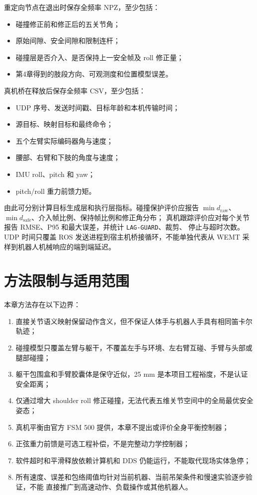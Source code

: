 重定向节点在退出时保存全频率 NPZ，至少包括：
\begin{itemize}
  \item 碰撞修正前和修正后的五关节角；
  \item 原始间隙、安全间隙和限制连杆；
  \item 碰撞层是否介入、是否保持上一安全帧及 roll 修正量；
  \item 第4章得到的肢段方向、可观测度和位置模型误差。
\end{itemize}

真机桥在释放后保存全频率 CSV，至少包括：
\begin{itemize}
  \item UDP 序号、发送时间戳、目标年龄和本机传输时间；
  \item 源目标、映射目标和最终命令；
  \item 五个左臂实际编码器角与速度；
  \item 腰部、右臂和下肢的角度与速度；
  \item IMU roll、pitch 和 yaw；
  \item pitch/roll 重力前馈力矩。
\end{itemize}

由此可分别计算目标生成层和执行层指标。碰撞保护评价应报告
$\min d_{\mathrm{raw}}$、$\min d_{\mathrm{safe}}$、介入帧比例、保持帧比例和修正角分布；
真机跟踪评价应对每个关节报告 RMSE、P95 和最大误差，并统计 \texttt{LAG-GUARD}、裁剪、
停止与超时次数。UDP 时间只覆盖 ROS 发送进程到宿主机桥接循环，不能单独代表从 WEMT
采样到机器人机械响应的端到端延迟。

\section{方法限制与适用范围}
\label{sec:ch5_limitations}

本章方法存在以下边界：
\begin{enumerate}[label=\arabic*)]
  \item 直接关节语义映射保留动作含义，但不保证人体手与机器人手具有相同笛卡尔轨迹；
  \item 碰撞模型只覆盖左臂与躯干，不覆盖左手与环境、左右臂互碰、手臂与头部或腿部碰撞；
  \item 躯干包围盒和手臂胶囊体是保守近似，25 mm 是本项目工程裕度，不是认证安全距离；
  \item 仅通过增大 shoulder roll 修正碰撞，无法代表五维关节空间中的全局最优安全姿态；
  \item 真机平衡由官方 FSM 500 提供，本章不提出或评价全身平衡控制器；
  \item 正弦重力前馈是可选工程补偿，不是完整动力学控制器；
  \item 软件超时和平滑释放依赖计算机和 DDS 仍能运行，不能取代现场实体急停；
  \item 所有速度、误差和包络阈值均针对当前机器、当前吊架条件和慢速实验逐步验证，不能
        直接推广到高速动作、负载操作或其他机器人。
\end{enumerate}

